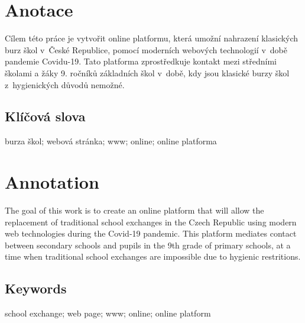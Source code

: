 \documentclass{template/socthesis}
\author{Vít Falta}
\begin{document}
	
	\maketitle
	
	
	
	\pagestyle{empty}
	
	\section*{Anotace}
	Cílem této práce je vytvořit online platformu, která umožní nahrazení klasických burz škol v~České Republice, pomocí moderních webových technologií v~době pandemie Covidu-19. Tato platforma zprostředkuje kontakt mezi středními školami a žáky 9. ročníků základních škol v~době, kdy jsou klasické burzy škol z~hygienických důvodů nemožné.
	
	\subsection*{Klíčová slova}
	burza škol; webová stránka; www; online; online platforma
	
	\vspace{20mm}
	
	\section*{Annotation}
	The goal of this work is to create an online platform that will allow the replacement of traditional school exchanges in the Czech Republic using modern web technologies during the Covid-19 pandemic. This platform mediates contact between secondary schools and pupils in the 9th grade of primary schools, at a time when traditional school exchanges are impossible due to hygienic restritions.

	\subsection*{Keywords}
	school exchange; web page; www; online; online platform
	
	\newpage
	\pagestyle{plain}
	
    \tableofcontents %
	
	\setcounter{figure}{0}
	\setcounter{table}{0}
	\newpage
	
\end{document}
